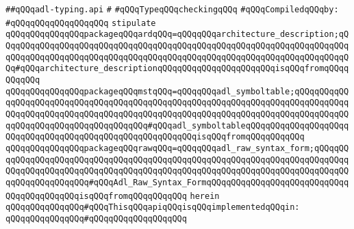 \label{src/lib/compiler/back/low/tools/arch/adl-typing.api}
\verb|##qQQqadl-typing.api|\newline
\verb|#|\newline
\verb|#qQQqTypeqQQqcheckingqQQq|\newline
\newline
\verb|#qQQqCompiledqQQqby:|\newline
\verb|#qQQqqQQqqQQqqQQqqQQq|\newline
\newline
\verb|stipulate|\newline
\verb|qQQqqQQqqQQqqQQqpackageqQQqardqQQq=qQQqqQQqarchitecture_description;qQQqqQQqqQQqqQQqqQQqqQQqqQQqqQQqqQQqqQQqqQQqqQQqqQQqqQQqqQQqqQQqqQQqqQQqqQQqqQQqqQQqqQQqqQQqqQQqqQQqqQQqqQQqqQQqqQQqqQQqqQQqqQQqqQQqqQQqqQQqqQQq#qQQqarchitecture_descriptionqQQqqQQqqQQqqQQqqQQqqQQqisqQQqfromqQQqqQQqqQQq|\newline
\verb|qQQqqQQqqQQqqQQqpackageqQQqmstqQQq=qQQqqQQqadl_symboltable;qQQqqQQqqQQqqQQqqQQqqQQqqQQqqQQqqQQqqQQqqQQqqQQqqQQqqQQqqQQqqQQqqQQqqQQqqQQqqQQqqQQqqQQqqQQqqQQqqQQqqQQqqQQqqQQqqQQqqQQqqQQqqQQqqQQqqQQqqQQqqQQqqQQqqQQqqQQqqQQqqQQqqQQqqQQqqQQqqQQq#qQQqadl_symboltableqQQqqQQqqQQqqQQqqQQqqQQqqQQqqQQqqQQqqQQqqQQqqQQqqQQqqQQqqQQqisqQQqfromqQQqqQQqqQQq|\newline
\verb|qQQqqQQqqQQqqQQqpackageqQQqrawqQQq=qQQqqQQqadl_raw_syntax_form;qQQqqQQqqQQqqQQqqQQqqQQqqQQqqQQqqQQqqQQqqQQqqQQqqQQqqQQqqQQqqQQqqQQqqQQqqQQqqQQqqQQqqQQqqQQqqQQqqQQqqQQqqQQqqQQqqQQqqQQqqQQqqQQqqQQqqQQqqQQqqQQqqQQqqQQqqQQqqQQqqQQq#qQQqAdl_Raw_Syntax_FormqQQqqQQqqQQqqQQqqQQqqQQqqQQqqQQqqQQqqQQqqQQqisqQQqfromqQQqqQQqqQQq|\newline
\verb|herein|\newline
\newline
\verb|qQQqqQQqqQQqqQQq#qQQqThisqQQqapiqQQqisqQQqimplementedqQQqin:|\newline
\verb|qQQqqQQqqQQqqQQq#qQQqqQQqqQQqqQQqqQQq|\newline
